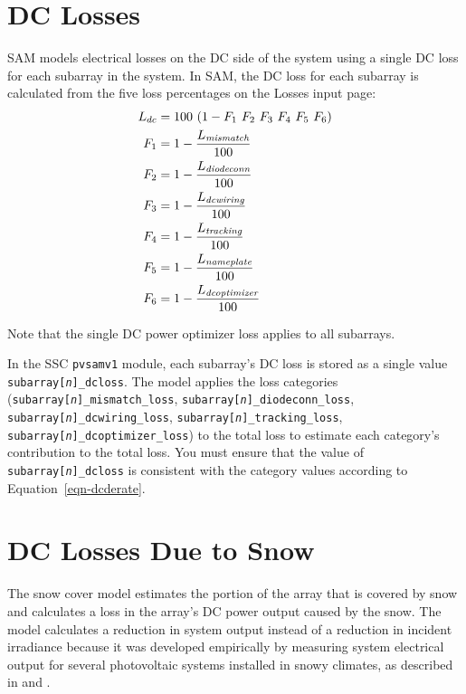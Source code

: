 \documentclass[12pt,letterpaper]{article}
\begin{document}
\section{DC Losses} \label{sec-dclosses}

SAM models electrical losses on the DC side of the system using a single DC loss for each subarray in the system. In SAM, the DC loss for each subarray is calculated from the five loss percentages on the Losses input page:
\begin{align}\label{eqn-dcderate}
L_{dc} &= 100~(1-F_1~F_2~F_3~F_4~F_5~F_6) \notag\\
F_{1} &= 1-\frac{L_{\textit{mismatch}}}{100} \notag\\
F_{2} &= 1-\frac{L_{\textit{diodeconn}}}{100} \notag\\
F_{3} &= 1-\frac{L_{\textit{dcwiring}}}{100} \notag\\
F_{4} &= 1-\frac{L_{\textit{tracking}}}{100} \notag\\
F_{5} &= 1-\frac{L_{\textit{nameplate}}}{100} \notag\\
F_{6} &= 1-\frac{L_{\textit{dcoptimizer}}}{100}
\end{align}

Note that the single DC power optimizer loss applies to all subarrays.

In the SSC \texttt{pvsamv1} module, each subarray's DC loss is stored as a single value \texttt{subarray[\textit{n}]\_dcloss}. The model applies the loss categories (\texttt{subarray[\textit{n}]\_mismatch\_loss}, \texttt{subarray[\textit{n}]\_diodeconn\_loss}, \texttt{subarray[\textit{n}]\_dcwiring\_loss}, \texttt{subarray[\textit{n}]\_tracking\_loss}, \texttt{subarray[\textit{n}]\_dcoptimizer\_loss}) to the total loss to estimate each category's contribution to the total loss. You must ensure that the value of \texttt{subarray[\textit{n}]\_dcloss} is consistent with the category values according to Equation~\ref{eqn-dcderate}.

\section{DC Losses Due to Snow}\label{sec-snow}

The snow cover model estimates the portion of the array that is covered by snow and calculates a loss in the array's DC power output caused by the snow. The model calculates a reduction in system output instead of a reduction in incident irradiance because it was developed empirically by measuring system electrical output for several photovoltaic systems installed in snowy climates, as described in \citet{marion-snowmodel} and \citet{ryberg-snowmodel}.
\end{document}
